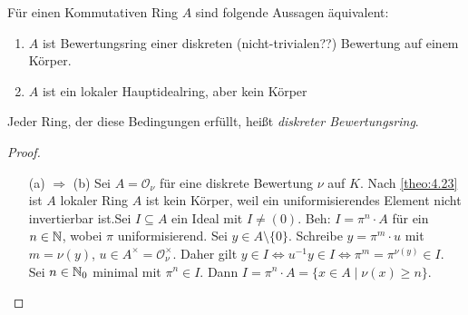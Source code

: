 \documentclass[../main.tex]{subfiles}
\begin{document}
\begin{theorem}%
    Für einen Kommutativen Ring $A$ sind folgende Aussagen äquivalent:
    \begin{enumerate}[label=(\alph*)]
        \item $A$ ist Bewertungsring einer diskreten (nicht-trivialen??) Bewertung auf einem Körper.
        \item $A$ ist ein lokaler Hauptidealring, aber kein Körper
    \end{enumerate}
    Jeder Ring, der diese Bedingungen erfüllt, heißt \emph{diskreter Bewertungsring}.
\end{theorem}
\begin{proof} $ $
    \begin{itemize}
        \item[(a) $\Rightarrow$ (b)]
        Sei $A=\mathcal{O}_\nu$ für eine diskrete Bewertung $\nu$ auf $K$.
        Nach \ref{theo:4.23} ist $A$ lokaler Ring
        $A$ ist kein Körper, weil ein uniformisierendes Element nicht invertierbar ist.
        Sei $I\subseteq A$ ein Ideal mit $I\neq (0)$.
        Beh: $I=\pi^n\cdot A$ für ein $n\in \mathbb{N}$, wobei $\pi$ uniformisierend.
        Sei $y\in A\setminus\{0\}$. Schreibe $y=\pi^m\cdot u$ mit $m=\nu(y)$, $u\in A^\times = \mathcal{O}_\nu^\times$.
        Daher gilt $y\in I\Leftrightarrow u^{-1}y\in I \Leftrightarrow \pi^m = \pi^{\nu(y)}\in I$.
        Sei $n\in \mathbb{N}_0$ minimal mit $\pi^n\in I$.
        Dann $I = \pi^n\cdot A = \{x\in A\mid \nu(x)\geq n\}$.
        

\end{itemize}
\end{proof}
\end{document}
